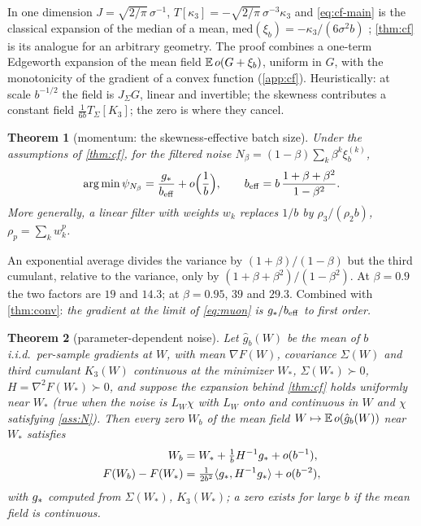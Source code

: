 \documentclass{article}
\theoremstyle{plain}
\newtheorem{theorem}{Theorem}
\theoremstyle{definition}
\theoremstyle{remark}
\begin{document}
In one dimension $J=\sqrt{2/\pi}\,\sigma^{-1}$, $T[\kappa_3]=-\sqrt{2/\pi}\,\sigma^{-3}\kappa_3$ and
\eqref{eq:cf-main} is the classical expansion of the median of a mean, $\mathrm{med}(\xi_b)=-\kappa_3/(6\sigma^2b)$
\citep{cornish1938moments}; \cref{thm:cf} is its analogue for an arbitrary geometry. The proof combines a one-term
Edgeworth expansion of the mean field $\mathbb{E}\,o(G+\xi_b)$, uniform in $G$, with the monotonicity of the gradient of a
convex function (\cref{app:cf}). Heuristically: at scale $b^{-1/2}$ the field is $J_\Sigma G$, linear and
invertible; the skewness contributes a constant field $\frac1{6b}T_\Sigma[K_3]$; the zero is where they cancel.

\begin{theorem}[momentum: the skewness-effective batch size]\label{thm:beff}
Under the assumptions of \cref{thm:cf}, for the filtered noise $N_\beta=(1-\beta)\sum_k\beta^k\xi_b^{(k)}$,
\[
\arg\min\psi_{N_\beta}=\frac{g_\ast}{b_{\mathrm{eff}}}+o\Big(\frac1b\Big),\qquad b_{\mathrm{eff}}=b\,\frac{1+\beta+\beta^2}{1-\beta^2}.
\]
More generally, a linear filter with weights $w_k$ replaces $1/b$ by $\rho_3/(\rho_2b)$, $\rho_p=\sum_kw_k^p$.
\end{theorem}

An exponential average divides the variance by $(1+\beta)/(1-\beta)$ but the third cumulant, relative to the
variance, only by $(1+\beta+\beta^2)/(1-\beta^2)$. At $\beta=0.9$ the two factors are $19$ and $14.3$; at
$\beta=0.95$, $39$ and $29.3$. Combined with \cref{thm:conv}: \emph{the gradient at the limit of \eqref{eq:muon} is
$g_\ast/b_{\mathrm{eff}}$ to first order.}

\begin{theorem}[parameter-dependent noise]\label{thm:state}
Let $\hat g_b(W)$ be the mean of $b$ i.i.d.\ per-sample gradients at $W$, with mean $\nabla F(W)$, covariance
$\Sigma(W)$ and third cumulant $K_3(W)$ continuous at the minimizer $W_\ast$, $\Sigma(W_\ast)\succ0$,
$H=\nabla^2F(W_\ast)\succ0$, and suppose the expansion behind \cref{thm:cf} holds uniformly near $W_\ast$ (true when the
noise is $L_W\chi$ with $L_W$ onto and continuous in $W$ and $\chi$ satisfying \cref{ass:N}). Then every zero $W_b$ of
the mean field $W\mapsto\mathbb{E}\,o(\hat g_b(W))$ near $W_\ast$ satisfies
\begin{align*}
W_b&=W_\ast+\tfrac1b H^{-1}g_\ast+o(b^{-1}),\\
F(W_b)-F(W_\ast)&=\tfrac1{2b^2}\langle g_\ast, H^{-1}g_\ast\rangle+o(b^{-2}),
\end{align*}
with $g_\ast$ computed from $\Sigma(W_\ast)$, $K_3(W_\ast)$; a zero exists for large $b$ if the mean field is continuous.
\end{theorem}
\end{document}
